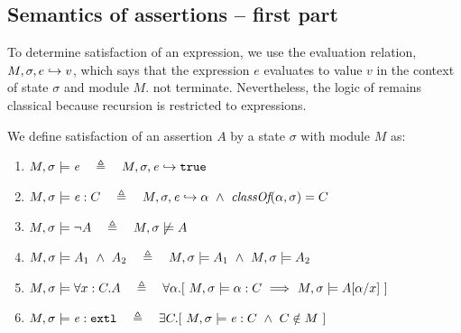 \subsection{Semantics of assertions %
-- first part}
\label{sect:semantics:assert:standard}

To determine satisfaction of an expression, we    use the evaluation relation, $M, \sigma, e \hookrightarrow v$,
which says that the expression $e$ evaluates
to value $v$ in the context of state $\sigma$ and module $M$.
{}
 not  terminate. Nevertheless, the logic of   %
 remains classical because recursion is restricted to expressions. %


\begin{definition} 
\label{def:chainmail-semantics}
We define satisfaction of an assertion $A$ by a %
state $\sigma$ with 
 module $M$ as:
\begin{enumerate}
\item
\label{cExpr}
$\satisfiesA{M}{\sigma}{{\re}}\ \ \ \triangleq \ \ \   \eval{M}{\sigma}{{\re}}{\true}$
\item
\label{cClass}
$M , \sigma \models {{\mathit{e}}} : C\ \ \ \triangleq \ \ \   M, \sigma, {\mathit{e}} \hookrightarrow \alpha\   \wedge \ \textit{classOf}(\alpha, \sigma)= C$
\item
$\satisfiesA{M}{\sigma}{\neg A}\ \ \ \triangleq \ \ \   {M},{\sigma}\not\models{A}$
\item
$\satisfiesA{M}{\sigma}{A_1\ \wedge\ A_2}\ \ \ \triangleq \ \ \   \satisfiesA{M}{\sigma}{A_1} \   \wedge \ \satisfiesA{M}{\sigma}{A_2}$
\item
\label{quant1}
$\satisfiesA{M}{\sigma}{\all{x:C}{A}} \ \ \ \triangleq \ \ \   
\forall \alpha.[\   \satisfiesA {M}{\sigma} {\alpha:C}  \ \Longrightarrow   \ \satisfiesA{M}{\sigma} {A[\alpha/x]} \ ] $

\item
\label{cExternal}
$\satisfiesA{M}{\sigma}{\external{{\re}}} \ \ \ \triangleq \ \ \  \exists C.[\ \satisfiesA{M}{\sigma}{{{\re}} : C} \ \wedge \ C \notin M \ ]$
\end{enumerate}
\end{definition}

